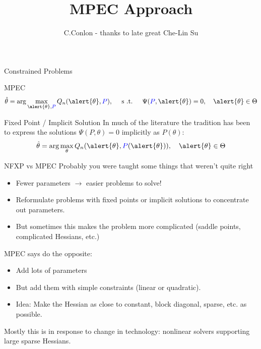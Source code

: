 \documentclass[aspectratio=169,11pt]{beamer}
\title [MPEC]{MPEC Approach}
\author{C.Conlon - thanks to late great Che-Lin Su}
\institute{Grad IO }
\date{}
\begin{document}
\begin{frame}
\titlepage
\end{frame}




\begin{frame}{Constrained Problems}
\begin{block}{MPEC}
\begin{align*}
\hat{\theta} = \arg \max_{\alert{\theta},\textcolor{blue}{P}} Q_n(\alert{\theta},\textcolor{blue}{P}), \quad  \mbox{ s .t. } \quad \Psi(\textcolor{blue}{P},\alert{\theta}) =0,  \quad \alert{\theta} \in \Theta
\end{align*} 
\end{block}
\pause
\begin{block}{Fixed Point / Implicit Solution}
In much of the literature the tradition has been to express the solutions $\Psi(P,\theta) =0$ implicitly as $P(\theta)$:
\begin{align*}
\hat{\theta} = \arg \max_{\theta} Q_n(\alert{\theta},\textcolor{blue}{P}(\alert{\theta})),  \quad \alert{\theta} \in \Theta
\end{align*}
\end{block}
\end{frame}

\begin{frame}{NFXP vs MPEC}
Probably you were taught some things that weren't quite right
\begin{itemize}
\item Fewer parameters $\rightarrow$ easier problems to solve!
\item Reformulate problems with fixed points or implicit solutions to \alert{concentrate out} parameters.
\item But sometimes this makes the problem more complicated (saddle points, complicated Hessians, etc.)
\end{itemize}
MPEC says do the opposite:
\begin{itemize}
\item Add lots of parameters
\item But add them with simple constraints (linear or quadratic).
\item Idea: Make the Hessian as close to constant, block diagonal, sparse, etc. as possible.
\end{itemize}
Mostly this is in response to change in technology: nonlinear solvers supporting large sparse Hessians.
\end{frame}
\end{document}
